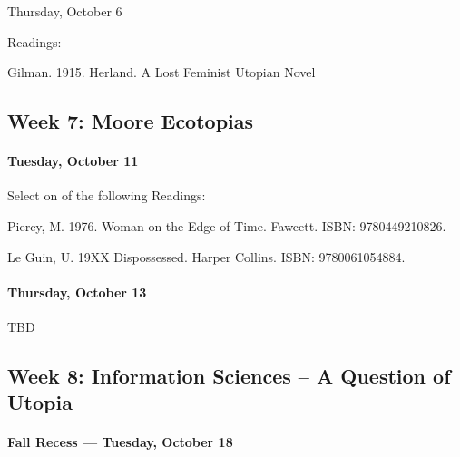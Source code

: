 Thursday, October 6

Readings: 
      
      \begin{itemize*}
      \item Gilman. 1915. Herland. A Lost Feminist Utopian Novel
      \end{itemize*}
      
      
      
      \subsection{\textbf{Week 7:} Moore Ecotopias}
      
\paragraph{Tuesday, October 11}

Select on of the following Readings:

  \begin{itemize*}
      \item Piercy, M. 1976. Woman on the Edge of Time. Fawcett. ISBN: 9780449210826.
      \item Le Guin, U. 19XX Dispossessed. Harper Collins. ISBN: 9780061054884.
      \end{itemize*}
      

\paragraph{Thursday, October 13}
      
      \begin{itemize*}
      \item TBD			
      \end{itemize*}
    
      
      
      \subsection{\textbf{Week 8}: Information Sciences -- A Question of Utopia}
      
      \paragraph{Fall Recess --- Tuesday, October 18}
    
